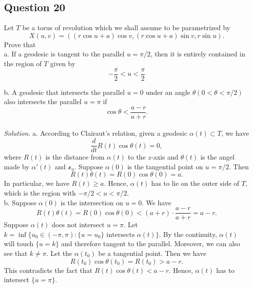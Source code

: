 \documentclass[12pt]{article}
\begin{document}
\subsection*{Question 20}
Let $T$ be a torus of revolution which we shall assume to be parametrized by \begin{equation*}
    X(u, v)=((r\cos u+a)\cos v,(r\cos u+a)\sin v,r\sin u).
\end{equation*}
Prove that\\

a. If a geodesic is tangent to the parallel $u = \pi/2$, then it is entirely contained in the region of $T$ given by\begin{equation*}
    -\frac{\pi}{2}<u<\frac{\pi}{2}
\end{equation*}

b. A geodesic that intersects the parallel $u = 0$ under an angle $\theta (0< \theta < \pi/2)$ also intersects the parallel $u = \pi$ if \begin{equation*}
    \cos \theta < \frac{a-r}{a+r}.
\end{equation*}\\

\textit{Solution}. 
a. According to Clairaut's relation, given a geodesic $\alpha(t)\subset T$, we have \begin{equation*}
    \frac{d}{dt} R(t)\cos\theta(t) = 0,
\end{equation*}
where $R(t)$ is the distance from $\alpha(t)$ to the $z$-axis and $\theta(t)$ is the angel made by $\alpha'(t)$ and $\mathcal{x}_u$. Suppose $\alpha(0)$ is the tangential point on $u = \pi/2$. Then \begin{equation*}
    R(t)\theta(t) = R(0)\cos\theta(0)= a.
\end{equation*}
In particular, we have $R(t)\geq a$. Hence, $\alpha(t)$ has to lie on the outer side of $T$, which is the region with $-\pi/2<u<\pi/2$.\\

b. Suppose $\alpha(0)$ is the intersection on $u = 0$. We have  \begin{equation*}
    R(t)\theta(t) = R(0)\cos\theta(0) < (a+r)\cdot \frac{a-r}{a+r} = a-r.
\end{equation*}
Suppose $\alpha(t)$ does not intersect $u=\pi$. Let $k = \inf\{u_0\in (-\pi,\pi):\text{$\{u=u_0\}$ intersects $\alpha(t)$}\}$. By the continuity, $\alpha(t)$ will touch $\{u=k\}$ and therefore tangent to the parallel. Moreover, we can also see that $k\neq \pi$. Let the $\alpha(t_0)$ be a tangential point. Then we have \begin{equation*}
    R(t_0)\cos\theta(t_0) = R(t_0) > a - r.
\end{equation*}
This contradicts the fact that $R(t)\cos\theta(t) < a-r$. Hence, 
$\alpha(t)$ has to intersect $\{u=\pi\}$.
\end{document}
